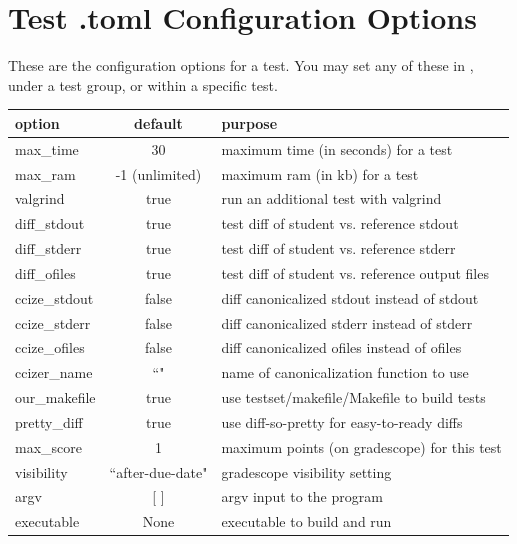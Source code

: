 \documentclass[11pt]{report}
\begin{document}
\section*{Test .toml Configuration Options}
These are the configuration options for a test. You may set any of these in \code{[common]},
under a test group, or within a specific test. 

\begin{tabular}{ | l | c | l | }
\hline			
\textbf{option} & \textbf{default} & \textbf{purpose} \\ \hline\hline
max\_time & 30 & maximum time (in seconds) for a test \\\hline
max\_ram & -1 (unlimited) & maximum ram (in kb) for a test \\\hline
valgrind & true & run an additional test with valgrind \\\hline
diff\_stdout & true & test diff of student vs. reference stdout \\\hline
diff\_stderr & true & test diff of student vs. reference stderr \\\hline
diff\_ofiles & true & test diff of student vs. reference output files \\\hline
ccize\_stdout & false & diff canonicalized stdout instead of stdout \\\hline
ccize\_stderr & false & diff canonicalized stderr instead of stderr \\\hline
ccize\_ofiles & false & diff canonicalized ofiles instead of ofiles \\\hline
ccizer\_name & ``" & name of canonicalization function to use \\\hline
our\_makefile & true & use testset/makefile/Makefile to build tests \\\hline
pretty\_diff & true & use diff-so-pretty for easy-to-ready diffs \\\hline
max\_score & 1 & maximum points (on gradescope) for this test \\\hline
visibility &``after-due-date" & gradescope visibility setting \\\hline
argv & [ ] & argv input to the program \\\hline
executable & None & executable to build and run \\\hline
\end{tabular}
\newpage
\end{document}
